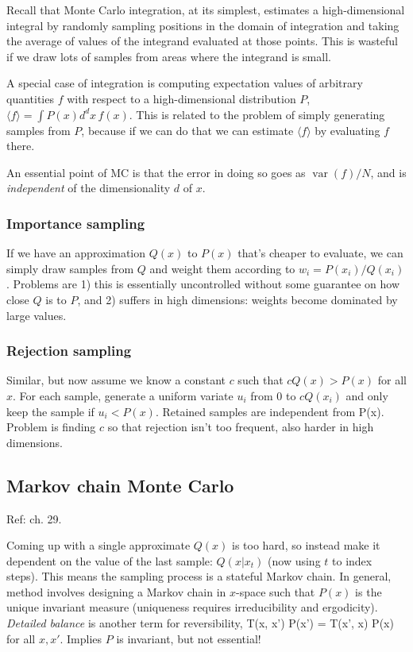 \documentclass[notitlepage,openany,11pt]{report}
\DeclareMathOperator{\var}{var}
\numberwithin{equation}{section}
\theoremstyle{plain}%
\begin{document}
Recall that Monte Carlo integration, at its simplest, estimates a high-dimensional integral by randomly sampling positions in the domain of integration  and taking the average of values of the integrand evaluated at those points. This is wasteful if we draw lots of samples from areas where the integrand is small.

A special case of integration is computing expectation values of arbitrary quantities $f$ with respect to a high-dimensional distribution $P$, $\langle f \rangle = \int \! P(x) d^{d} x \, f(x)$. This is related to the problem of simply generating samples from $P$, because if we can do that we can estimate  $\langle f \rangle$ by evaluating $f$ there. 

An essential point of MC is that the error in doing so goes as $\var(f) / N$, and is \emph{independent} of the dimensionality $d$ of $x$. 

\subsubsection{Importance sampling} 
If we have an approximation $Q(x)$ to $P(x)$ that's cheaper to evaluate, we can simply draw samples from $Q$ and weight them according to $w_{i} = P(x_{i}) / Q(x_{i})$. Problems are 1) this is essentially uncontrolled without some guarantee on how close $Q$ is to $P$, and 2) suffers in high dimensions: weights become dominated by large values.

\subsubsection{Rejection sampling} 
Similar, but now assume we know a constant $c$ such that $cQ(x) > P(x)$ for all $x$. For each sample, generate a uniform variate $u_{i}$ from $0$ to $cQ(x_{i})$ and only keep the sample if $u_{i} < P(x)$. Retained samples are independent from P(x). Problem is finding $c$ so that rejection isn't too frequent, also harder in high dimensions.

\subsection{Markov chain Monte Carlo} 
Ref: \cite{MacKay:03} ch. 29.

Coming up with a single approximate $Q(x)$ is too hard, so instead make it dependent on the value of the last sample: $Q(x| x_{t})$ (now using $t$ to index steps). This means the sampling process is a stateful Markov chain. In general, method involves designing a Markov chain in $x$-space such that $P(x)$ is the unique invariant measure (uniqueness requires irreducibility and ergodicity). \emph{Detailed balance} is another term for reversibility,
\be
T(x, x') P(x') = T(x', x) P(x)
\ee
for all $x, x'$. Implies $P$ is invariant, but not essential!
\end{document}
